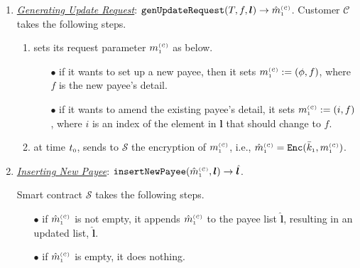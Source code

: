 \begin{enumerate}[leftmargin=.46cm]
\item\label{genUpdateRequest}  {\underline{\textit{Generating  Update Request}}: $\mathtt{genUpdateRequest}(T, f, {\bm l})\rightarrow \hat m^{\scriptscriptstyle\mathcal{(C)}}_{\scriptscriptstyle 1}$}.
%
Customer $\mathcal{C}$ takes the following steps. 

\begin{enumerate}
%
\item sets its request parameter $m_{\scriptscriptstyle 1}^{\scriptscriptstyle(\mathcal C)}$ as below. 
%
\begin{itemize}

\item[$\bullet$] if it wants to set up a new payee, then it sets $m_{\scriptscriptstyle 1}^{\scriptscriptstyle(\mathcal C)}:=(\phi,f)$, where $f$ is the new payee's detail.  %

%
\item[$\bullet$] if it wants to amend the existing payee's detail,   it sets $m_{\scriptscriptstyle 1}^{\scriptscriptstyle(\mathcal C)}:=(i, f)$, where $i$ is an index of the element in $\bm l$ that should  change to $f$.  %



\end{itemize}
\item\label{send-update-req} at time $t_{\scriptscriptstyle 0}$, sends to $\mathcal{S}$  the encryption of $m_{\scriptscriptstyle 1}^{\scriptscriptstyle(\mathcal C)}$, i.e., $\hat m_{\scriptscriptstyle 1}^{\scriptscriptstyle(\mathcal C)}=\mathtt{Enc}(\bar k_{\scriptscriptstyle 1}, m_{\scriptscriptstyle 1}^{\scriptscriptstyle(\mathcal C)})$. 
\end{enumerate}
%

 \item \underline{\textit{Inserting New Payee}}: $\mathtt{insertNewPayee}(\hat m^{\scriptscriptstyle\mathcal{(C)}}_{\scriptscriptstyle 1}, {\bm l})\rightarrow {\hat{\bm l}}$.
 
Smart contract $\mathcal{S}$ takes the following steps. 
 \begin{itemize}
 \item[$\bullet$] if $\hat m_{\scriptscriptstyle 1}^{\scriptscriptstyle(\mathcal C)}$  is not empty, it appends $\hat m_{\scriptscriptstyle 1}^{\scriptscriptstyle(\mathcal C)}$ to the payee list $\hat{\bm l}$, resulting in an updated list, $\hat{\bm l}$. 
  \item[$\bullet$] if $\hat m_{\scriptscriptstyle 1}^{\scriptscriptstyle(\mathcal C)}$ is empty,  it does nothing. 
 \end{itemize}
 

\end{enumerate}
